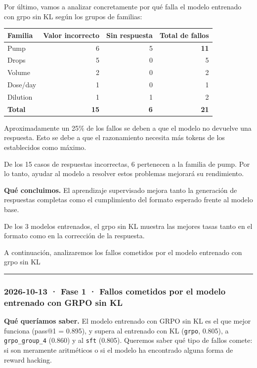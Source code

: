 Por último, vamos a analizar concretamente por qué falla el modelo entrenado con grpo sin KL según los grupos de familias:

{\def\LTcaptype{none} %
\small\setlength{\tabcolsep}{3pt}
\begin{longtable}[]{@{}lrrr@{}}
\toprule\noalign{}
Familia & Valor incorrecto & Sin respuesta & Total de fallos \\
\midrule\noalign{}
\endhead
\bottomrule\noalign{}
\endlastfoot
Pump & 6 & 5 & \textbf{11} \\
Drops & 5 & 0 & 5 \\
Volume & 2 & 0 & 2 \\
Dose/day & 1 & 0 & 1 \\
Dilution & 1 & 1 & 2 \\
\textbf{Total} & \textbf{15} & \textbf{6} & \textbf{21} \\
\end{longtable}
}

Aproximadamente un 25\% de los fallos se deben a que el modelo no devuelve una respuesta. Esto se debe a que el razonamiento necesita más tokens de los establecidos como máximo.

De los 15 casos de respuestas incorrectas, 6 pertenecen a la familia de pump. Por lo tanto, ayudar al modelo a resolver estos problemas mejorará su rendimiento.

\textbf{Qué concluimos.} El aprendizaje supervisado mejora tanto la generación de respuestas completas como el cumplimiento del formato esperado frente al modelo base.

De los 3 modelos entrenados, el grpo sin KL muestra las mejores tasas tanto en el formato como en la corrección de la respuesta.

A continuación, analizaremos los fallos cometidos por el modelo entrenado con grpo sin KL

\begin{center}\rule{0.5\linewidth}{0.5pt}\end{center}

\subsubsection{2026-10-13 · Fase 1 · Fallos cometidos por el modelo entrenado con GRPO sin KL}

\textbf{Qué queríamos saber.} El modelo entrenado con GRPO sin KL es el que mejor funciona (pass@1 = 0.895), y supera al entrenado con KL (\texttt{grpo}, 0.805), a \texttt{grpo\_\allowbreak{}group\_\allowbreak{}4} (0.860) y al \texttt{sft} (0.805). Queremos saber qué tipo de fallos comete: si son meramente aritméticos o si el modelo ha encontrado alguna forma de reward hacking.

